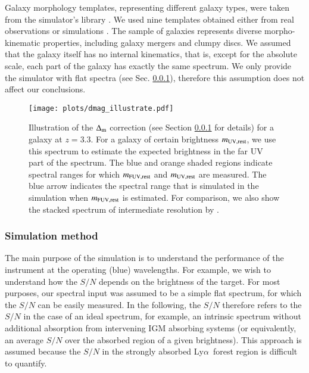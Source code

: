 \documentclass{aa}
\newcommand{\lya}{Ly$\alpha$}
\begin{document}
Galaxy morphology templates, representing different galaxy types, were taken from the simulator's library \citep[see][]{Puech2010}. We used nine templates obtained either from real observations \citep{Fuentes2004,Garrido2002,Garrido2004} or simulations \citep{Cox2006,Bournaud2008}. The sample of galaxies represents diverse morpho-kinematic properties, including galaxy mergers and clumpy discs. We assumed that the galaxy itself has no internal kinematics, that is, except for the absolute scale, each part of the galaxy has exactly the same spectrum. We only provide the simulator with flat spectra (see Sec. \ref{additional}), therefore this assumption does not affect our conclusions.

\begin{figure}
\begin{center}
\texttt{[image: plots/dmag\_illustrate.pdf]}
\caption{Illustration of the $\Delta_{\rm m}$ correction (see Section \ref{additional} for details) for a galaxy at $z = 3.3$. For a galaxy of certain brightness $m_{\rm UV,rest}$, we use this spectrum \citep{Shapley2003} to estimate the expected brightness in the far UV part of the spectrum. The blue and orange shaded regions indicate spectral ranges for which $m_{\rm FUV,rest}$ and $m_{\rm UV,rest}$ are measured. The blue arrow indicates the spectral range that is simulated in the simulation when $m_{\rm FUV,rest}$ is estimated. For comparison, we also show the stacked spectrum of intermediate resolution by \citet{Rigby18}.}
\label{fig1a}
\end{center}
\end{figure}

\subsubsection{Simulation method}
\label{additional}

The main purpose of the simulation is to understand the performance of the instrument at the operating (blue) wavelengths. For example, we wish to understand how the $S/N$ depends on the brightness of the target. For most purposes, our spectral input was assumed to be a simple flat spectrum, for which the $S/N$ can be easily measured. In the following, the $S/N$ therefore refers to the $S/N$ in the case of an ideal spectrum, for example, an intrinsic spectrum without additional absorption from intervening IGM absorbing systems (or equivalently, an average $S/N$ over the absorbed region of a given brightness). This approach is assumed because the $S/N$ in the strongly absorbed \lya\, forest region is difficult to quantify.
\end{document}

